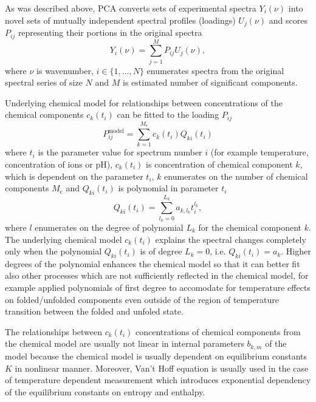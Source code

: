 As was described above, PCA converts sets of experimental spectra $Y_i(\nu)$
into novel sets of mutually independent spectral profiles (loadings)
$U_j(\nu)$ and scores $P_{ij}$ representing their portions in the original
spectra
\begin{equation*}
	Y_i(\nu) = \sum_{j=1}^M P_{ij}U_j(\nu),
\end{equation*}
where $\nu$ is wavenumber, $i \in \{1,\dots,N\}$ enumerates spectra from the
original spectral series of size $N$ and $M$ is estimated number of
significant components.

Underlying chemical model for relationships between concentrations of the
chemical components $c_k(t_i)$ can be fitted to the loading $P_{ij}$
\begin{equation*}
	P_{ij}^\text{model} = \sum_{k=1}^{M_\text{c}} c_k(t_i) Q_{ki}(t_i)
\end{equation*}
where $t_i$ is the parameter value for spectrum number $i$ (for example
temperature, concentration of ions or pH),
$c_k(t_i)$ is concentration of chemical component $k$, which is dependent on
the parameter $t_i$,
$k$ enumerates on the number of chemical components $M_\text{c}$ and
$Q_{ki}(t_i)$ is polynomial in parameter $t_i$
\begin{equation*}
	Q_{ki}(t_i) = \sum_{l_k=0}^{L_k} a_{k,l_k} t_i^{l_k},
\end{equation*}
where $l$ enumerates on the degree of polynomial $L_k$ for the chemical
component $k$.
The underlying chemical model $c_k(t_i)$ explains the spectral changes
completely only when the polynomial $Q_{ki}(t_i)$ is of degree
$L_k = 0$, i.e. $Q_{ki}(t_i) = a_k$.
Higher degrees of the polynomial enhances the chemical model so that it can
better fit also other processes which are not sufficiently reflected in the
chemical model, for example
\textcite{Klener2021}
applied polynomials of first degree to accomodate for temperature effects on
folded/unfolded components even outside of the region of temperature transition
between the folded and unfoled state.

The relationships between $c_k(t_i)$ concentrations of chemical components from
the chemical model are usually not linear in internal parameters $b_{k,m}$ of
the model because the chemical model is usually dependent on equilibrium
constants $K$ in nonlinear manner.
Moreover, Van't Hoff equation is usually used in the case of temperature
dependent measurement which introduces exponential dependency of the
equilibrium constants on entropy and enthalpy.

